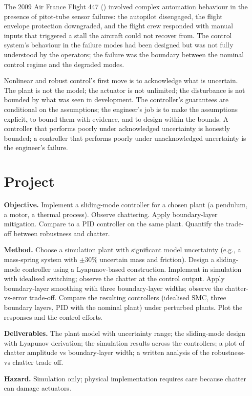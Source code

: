 The 2009 Air France Flight 447 (\cite{acc:bea-af447}) involved complex automation behaviour in the presence of pitot-tube sensor failures: the autopilot disengaged, the flight envelope protection downgraded, and the flight crew responded with manual inputs that triggered a stall the aircraft could not recover from. The control system's behaviour in the failure modes had been designed but was not fully understood by the operators; the failure was the boundary between the nominal control regime and the degraded modes.

\begin{principle}
Nonlinear and robust control's first move is to acknowledge what is uncertain. The plant is not the model; the actuator is not unlimited; the disturbance is not bounded by what was seen in development. The controller's guarantees are conditional on the assumptions; the engineer's job is to make the assumptions explicit, to bound them with evidence, and to design within the bounds. A controller that performs poorly under acknowledged uncertainty is honestly bounded; a controller that performs poorly under unacknowledged uncertainty is the engineer's failure.
\end{principle}

\section{Project}

\begin{project}
\textbf{Objective.} Implement a sliding-mode controller for a chosen plant (a pendulum, a motor, a thermal process). Observe chattering. Apply boundary-layer mitigation. Compare to a PID controller on the same plant. Quantify the trade-off between robustness and chatter.

\textbf{Method.} Choose a simulation plant with significant model uncertainty (e.g., a mass-spring system with $\pm 30\%$ uncertain mass and friction). Design a sliding-mode controller using a Lyapunov-based construction. Implement in simulation with idealised switching; observe the chatter at the control output. Apply boundary-layer smoothing with three boundary-layer widths; observe the chatter-vs-error trade-off. Compare the resulting controllers (idealised SMC, three boundary layers, PID with the nominal plant) under perturbed plants. Plot the responses and the control efforts.

\textbf{Deliverables.} The plant model with uncertainty range; the sliding-mode design with Lyapunov derivation; the simulation results across the controllers; a plot of chatter amplitude vs boundary-layer width; a written analysis of the robustness-vs-chatter trade-off.

\textbf{Hazard.} Simulation only; physical implementation requires care because chatter can damage actuators.
\end{project}

